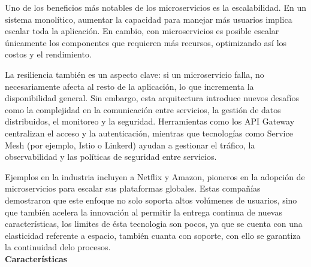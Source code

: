 \documentclass[12pt,letterpaper]{article}
\begin{document}
Uno de los beneficios más notables de los microservicios es la escalabilidad. En un sistema monolítico, aumentar la capacidad para manejar más usuarios implica escalar toda la aplicación. En cambio, con microservicios es posible escalar únicamente los componentes que requieren más recursos, optimizando así los costos y el rendimiento. 

La resiliencia también es un aspecto clave: si un microservicio falla, no necesariamente afecta al resto de la aplicación, lo que incrementa la disponibilidad general. Sin embargo, esta arquitectura introduce nuevos desafíos como la complejidad en la comunicación entre servicios, la gestión de datos distribuidos, el monitoreo y la seguridad. Herramientas como los API Gateway centralizan el acceso y la autenticación, mientras que tecnologías como Service Mesh (por ejemplo, Istio o Linkerd) ayudan a gestionar el tráfico, la observabilidad y las políticas de seguridad entre servicios. 

Ejemplos en la industria incluyen a Netflix y Amazon, pioneros en la adopción de microservicios para escalar sus plataformas globales. Estas compañías demostraron que este enfoque no solo soporta altos volúmenes de usuarios, sino que también acelera la innovación al permitir la entrega continua de nuevas características, los limites de ésta tecnologia son pocos, ya que se cuenta con una elasticidad referente a espacio, también cuanta con soporte, con ello se garantiza la continuidad delo procesos.  \\

\textbf{Características} \\
\end{document}
